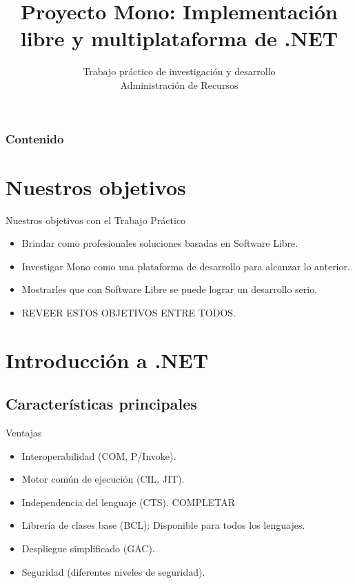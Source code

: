 \documentclass{beamer}
\title[Proyecto Mono]
{Proyecto Mono: Implementación libre y multiplataforma de .NET}
\date[TP Adm. de Recursos]
{Trabajo práctico de investigación y desarrollo \\ Administración de Recursos}
\begin{document}
\begin{frame}
  \titlepage
\end{frame}

\begin{frame}
  \frametitle{Contenido}
  \tableofcontents
\end{frame}


\section{Nuestros objetivos}

\begin{frame}{Nuestros objetivos con el Trabajo Práctico}
  \begin{itemize}
    \item Brindar como profesionales soluciones basadas en Software Libre.
    \item Investigar Mono como una plataforma de desarrollo para alcanzar lo anterior.
    \item Mostrarles que con Software Libre se puede lograr un desarrollo serio.
    \item REVEER ESTOS OBJETIVOS ENTRE TODOS.
  \end{itemize}
\end{frame}


\section{Introducción a .NET}

\subsection{Características principales}

\begin{frame}{Ventajas}
  \begin{itemize}
    \item Interoperabilidad (COM, P/Invoke).
    \item Motor común de ejecución (CIL, JIT).
    \item Independencia del lenguaje (CTS). COMPLETAR
    \item Librería de clases base (BCL): Disponible para todos los lenguajes.
    \item Despliegue simplificado (GAC).
    \item Seguridad (diferentes niveles de seguridad).
  \end{itemize}
\end{frame}
\end{document}
